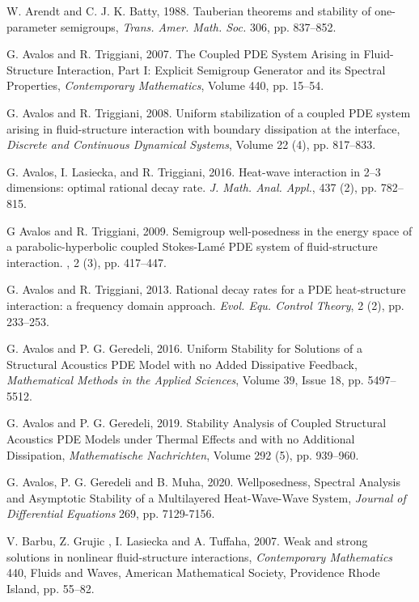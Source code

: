 \documentclass[11pt]{article}
\begin{document}
\begin{thebibliography}{99}
 W. Arendt and C. J. K. Batty, 1988. Tauberian theorems and stability
of one-parameter semigroups, \textit{Trans. Amer. Math. Soc.} 306, pp. 837--852.

 G. Avalos and R. Triggiani, 2007. The Coupled PDE System Arising in
Fluid-Structure Interaction, Part I: Explicit Semigroup Generator and its
Spectral Properties, \textit{Contemporary Mathematics}, Volume 440,
pp. 15--54.

 G. Avalos and R. Triggiani, 2008. Uniform stabilization of a coupled PDE system arising in fluid-structure interaction with boundary dissipation at the interface, \textit{Discrete and Continuous Dynamical Systems}, Volume 22 (4), pp. 817--833.

 G. Avalos, I. Lasiecka, and
R. Triggiani, 2016. Heat-wave interaction in 2--3 dimensions:
optimal rational decay  rate. {\em J. Math. Anal. Appl.},
437 (2), pp. 782--815.

 G Avalos and R. Triggiani, 2009.
\newblock Semigroup well-posedness in the energy space of a  parabolic-hyperbolic
coupled {S}tokes-{L}am\'{e} {PDE} system of  fluid-structure interaction. , 2 (3), pp. 417--447.

 G. Avalos and R. Triggiani, 2013.
Rational decay rates for a {PDE} heat-structure interaction: a  frequency
domain approach. {\em Evol. Equ. Control Theory}, 2 (2), pp. 233--253.

 G. Avalos and P. G. Geredeli, 2016. Uniform Stability for
Solutions of a Structural Acoustics PDE Model with no Added Dissipative
Feedback, \textit{Mathematical Methods in the Applied Sciences}, Volume 39,
Issue 18, pp.  5497--5512.

 G. Avalos and P. G. Geredeli, 2019. Stability
Analysis of Coupled Structural Acoustics PDE Models under Thermal Effects
and with no Additional Dissipation, \emph{Mathematische
Nachrichten}, Volume 292 (5), pp. 939--960.

 G. Avalos, P. G. Geredeli and B. Muha, 2020. Wellposedness, Spectral Analysis and Asymptotic Stability of a Multilayered Heat-Wave-Wave System,  \textit{Journal of Differential Equations} 269, pp. 7129-7156. 

 V. Barbu, Z. Grujic , I. Lasiecka and A. Tuffaha, 2007.
Weak and strong solutions in nonlinear fluid-structure interactions, 
\textit{Contemporary Mathematics} 440, Fluids and Waves, American
Mathematical Society, Providence Rhode Island, pp. 55--82.


\end{thebibliography}
\end{document}
